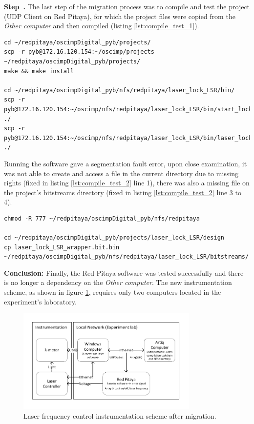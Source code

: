 \documentclass[a4paper,12pt]{article}
\newcounter{step}
\newenvironment{step}[1][]{\refstepcounter{step}\par\medskip
	\textbf{Step~\thestep. #1} \rmfamily }{\medskip}
\begin{document}
\begin{step}
The last step of the migration process was to compile and test the project (UDP Client on Red Pitaya), for which the project files were copied from the \textit{Other computer} and then compiled (listing \ref{lst:compile_test_1}).

\begin{lstlisting}[style=bash,label={lst:compile_test_1},caption={Copying project files and compile.}]
cd ~/redpitaya/oscimpDigital_pyb/projects/
scp -r pyb@172.16.120.154:~/oscimp/projects ~/redpitaya/oscimpDigital_pyb/projects/
make && make install

cd ~/redpitaya/oscimpDigital_pyb/nfs/redpitaya/laser_lock_LSR/bin/
scp -r pyb@172.16.120.154:~/oscimp/nfs/redpitaya/laser_lock_LSR/bin/start_lock.sh ./
scp -r pyb@172.16.120.154:~/oscimp/nfs/redpitaya/laser_lock_LSR/bin/laser_lock_LSR_us.sh ./
\end{lstlisting}

Running the software gave a segmentation fault error, upon close examination, it was not able to create and access a file in the current directory due to missing rights (fixed in listing \ref{lst:compile_test_2} line 1), there was also a missing file on the project's bitstreams directory (fixed in listing \ref{lst:compile_test_2} line 3 to 4).

\begin{lstlisting}[style=bash,label={lst:compile_test_2},caption={Correcting directory rights and copying missing file on bitstreams.}]
chmod -R 777 ~/redpitaya/oscimpDigital_pyb/nfs/redpitaya

cd ~/redpitaya/oscimpDigital_pyb/projects/laser_lock_LSR/design
cp laser_lock_LSR_wrapper.bit.bin ~/redpitaya/oscimpDigital_pyb/nfs/redpitaya/laser_lock_LSR/bitstreams/
\end{lstlisting}

\textbf{Conclusion:} Finally, the Red Pitaya software was tested successfully and there is no longer a dependency on the \textit{Other computer}. The new instrumentation scheme, as shown in figure \ref{fig:schematic_2}, requires only two computers located in the experiment's laboratory.

\begin{figure}[!h]
    \centering
    \includegraphics[width=0.8\textwidth]{Images/schematic_after_migration.pdf}
    \captionsetup{justification=centering}
    \caption{Laser frequency control instrumentation scheme after migration.}
    \label{fig:schematic_2}
\end{figure}


\end{step}
\end{document}

